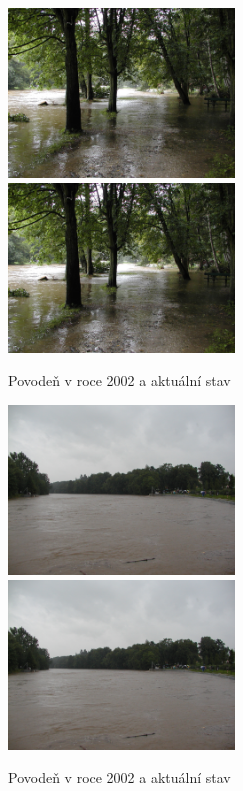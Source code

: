 \documentclass[thesis=M,czech]{FITthesis}[2012/06/26]
\begin{document}
\begin{figure}[h!]
\centering
\includegraphics[width=6cm]{pics/povoden2.jpg}
\includegraphics[width=6cm]{pics/povoden2.jpg}
\caption{Povodeň v roce 2002 a aktuální stav}
\label{obr:povoden_hrad}
\end{figure}

\begin{figure}[h!]
\centering
\includegraphics[width=6cm]{pics/povoden3.jpg}
\includegraphics[width=6cm]{pics/povoden3.jpg}
\caption{Povodeň v roce 2002 a aktuální stav}
\label{obr:povoden_hrad}
\end{figure}
\end{document}
